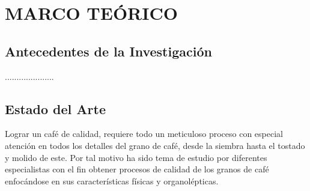 \chapter{MARCO TEÓRICO}
\label{chapter:teoria}

\section{Antecedentes de la Investigación}
\label{section:description}
.....................


\section{Estado del Arte}
Lograr un café de calidad, requiere todo un meticuloso proceso con especial atención en todos los detalles del grano de café, desde la siembra hasta el tostado y molido de este. Por tal motivo ha sido tema de estudio por diferentes especialistas con el fin obtener procesos de calidad de los granos de café enfocándose en sus características físicas y organolépticas.

